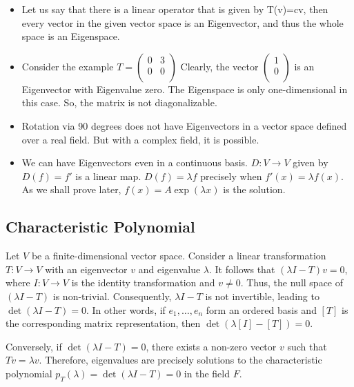 \begin{itemize}
    \item Let us say that there is a linear operator that is given by T(v)=cv, then every vector in the given vector space is an Eigenvector, and thus the whole space is an Eigenspace.
    \item Consider the example $T=\begin{pmatrix}
        0 & 3\\
        0 & 0\\
    \end{pmatrix}$ Clearly, the vector $\begin{pmatrix}
        1 \\ 0\\
    \end{pmatrix}$ is an Eigenvector with Eigenvalue zero.
    The Eigenspace is only one-dimensional in this case. So, the matrix is not diagonalizable.
    \item Rotation via 90 degrees does not have Eigenvectors in a vector space defined over a real field. But with a complex field, it is possible. 
    \item We can have Eigenvectors even in a continuous basis. $D : V \to V$  given by $D(f ) = f'$
is a linear map. $D(f)=\lambda f$ precisely when $f'(x) = \lambda f (x)$. As
we shall prove later, $f (x) = A\exp(\lambda x)$ is the solution.
\end{itemize}



\subsection{Characteristic Polynomial}

Let $V$ be a finite-dimensional vector space. Consider a linear transformation $T: V \to V$ with an eigenvector $v$ and eigenvalue $\lambda$. It follows that $(\lambda I - T)v = 0$, where $I: V \to V$ is the identity transformation and $v \neq 0$. Thus, the null space of $(\lambda I - T)$ is non-trivial. Consequently, $\lambda I - T$ is not invertible, leading to $\det(\lambda I - T) = 0$. In other words, if $e_1, \ldots, e_n$ form an ordered basis and $[T]$ is the corresponding matrix representation, then $\det(\lambda[I] - [T]) = 0$.

Conversely, if $\det(\lambda I - T) = 0$, there exists a non-zero vector $v$ such that $Tv = \lambda v$. Therefore, eigenvalues are precisely solutions to the characteristic polynomial $p_T(\lambda) = \det(\lambda I - T) = 0$ in the field $F$.

